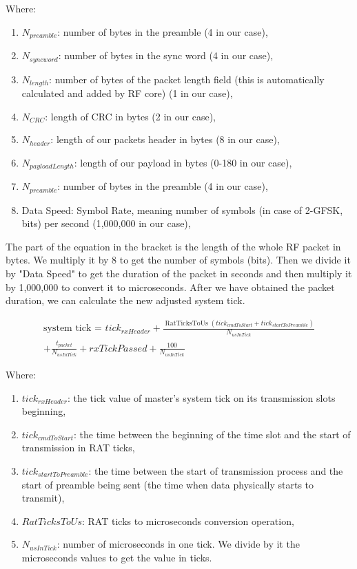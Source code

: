 Where:
\begin{enumerate}[nolistsep]
    \item \(N_{preamble}\): number of bytes in the preamble (4 in our case),
    \item \(N_{syncword}\): number of bytes in the sync word (4 in our case),
    \item \(N_{length}\): number of bytes of the packet length field (this is automatically calculated and added by RF core) (1 in our case),
    \item \(N_{CRC}\): length of CRC in bytes  (2 in our case),
    \item \(N_{header}\): length of our packets header in bytes (8 in our case),
    \item \(N_{payloadLength}\): length of our payload in bytes (0-180 in our case),
    \item \(N_{preamble}\): number of bytes in the preamble (4 in our case),
    \item Data Speed: Symbol Rate, meaning number of symbols (in case of 2-GFSK, bits) per second (1,000,000 in our case),
\end{enumerate}

The part of the equation in the bracket is the length of the whole RF packet in bytes. We multiply it by 8 to get the number of symbols (bits). Then we divide it by "Data Speed" to get the duration of the packet in seconds and then multiply it by 1,000,000 to convert it to microseconds. After we have obtained the packet duration, we can calculate the new adjusted system tick.

\begin{multline}
\text{system tick = } tick_{rxHeader} + \frac{\operatorname{RatTicksToUs} (tick_{cmdToStart} + tick_{startToPreamble})}{N_{usInTick}} \\  + \frac{t_{packet}}{N_{usInTick}} + rxTickPassed + \frac{100}{N_{usInTick}}
\end{multline}

Where:
\begin{enumerate}[nolistsep]
    \item \(tick_{rxHeader}\): the tick value of master's system tick on its transmission slots beginning,
    \item \(tick_{cmdToStart}\): the time between the beginning of the time slot and the start of transmission in RAT ticks,
    \item \(tick_{startToPreamble}\): the time between the start of transmission process and the start of preamble being sent (the time when data physically starts to transmit),
    \item \(RatTicksToUs\): RAT ticks to microseconds conversion operation,
    \item \(N_{usInTick}\): number of microseconds in one tick. We divide by it the microseconds values to get the value in ticks.
\end{enumerate}

